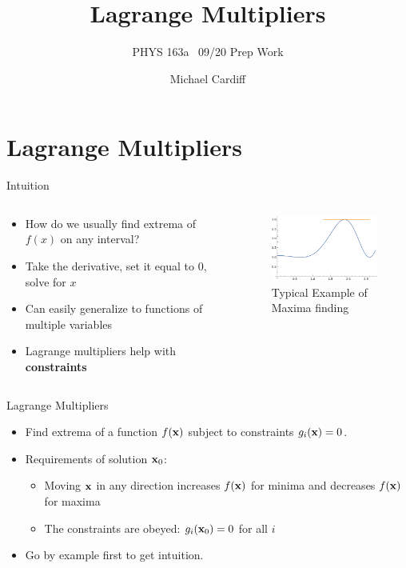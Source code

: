 \documentclass{beamer}
\title{Lagrange Multipliers}
\author{Michael Cardiff}
\subtitle{PHYS 163a \ 09/20 Prep Work}
\begin{document}
\begin{frame}
  \titlepage
\end{frame}
\section{Lagrange Multipliers}
\begin{frame}{Intuition}
  \begin{columns}
    \begin{column}{0.4\textwidth}
      \begin{itemize}
      \item How do we usually find extrema of $f(x)$ on any interval?
      \item Take the derivative, set it equal to $0$, solve for $x$
      \item Can easily generalize to functions of multiple variables
      \item Lagrange multipliers help with \textbf{constraints}
      \end{itemize}
    \end{column}
    \begin{column}{0.6\textwidth}
      \begin{figure}[H]
        \centering
        \includegraphics[width=5.0cm]{minmax.png}
        \caption{Typical Example of Maxima finding}
      \end{figure}
    \end{column}
  \end{columns}
\end{frame}
\begin{frame}{Lagrange Multipliers}
  \begin{itemize}
  \item Find extrema of a function $f(\vb{x})$ subject to constraints $g_i(\vb{x})=0$.
  \item Requirements of solution $\vb{x}_0$:
    \begin{itemize}
    \item Moving $\vb{x}$ in any direction increases $f(\vb{x})$ for minima and decreases $f(\vb{x})$ for maxima
    \item The constraints are obeyed: $g_i(\vb{x}_0)=0$ for all $i$
    \end{itemize}
  \item Go by example first to get intuition.
  \end{itemize}
\end{frame}
\end{document}
